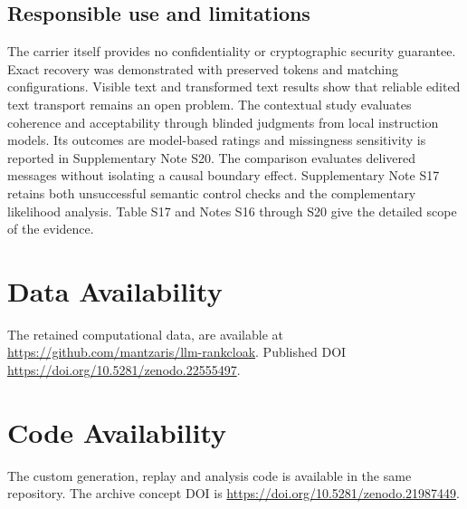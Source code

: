 \documentclass[fleqn,10pt]{wlscirep}
\begin{document}
\subsection*{Responsible use and limitations}\label{sec:limitations}

The carrier itself provides no confidentiality or cryptographic security guarantee. Exact recovery was demonstrated with preserved tokens and matching configurations. Visible text and transformed text results show that reliable edited text transport remains an open problem. 
The contextual study evaluates coherence and acceptability through blinded judgments from local instruction models. Its outcomes are model-based ratings and missingness sensitivity is reported in Supplementary Note S20. The comparison evaluates delivered messages without isolating a causal boundary effect. Supplementary Note S17 retains both unsuccessful semantic control checks and the complementary likelihood analysis. Table S17 and Notes S16 through S20 give the detailed scope of the evidence.




\section*{Data Availability}\label{sec:data-code}

The retained computational data, are available at \url{https://github.com/mantzaris/llm-rankcloak}. Published DOI \url{https://doi.org/10.5281/zenodo.22555497}.

\section*{Code Availability}
The custom generation, replay and analysis code is available in the same repository. The archive concept DOI is \url{https://doi.org/10.5281/zenodo.21987449}. 
\end{document}
